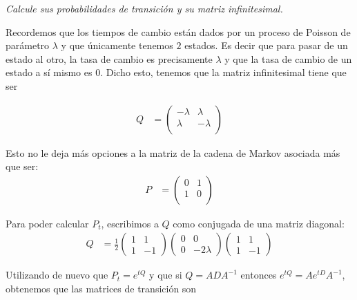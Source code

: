 \emph{
    Calcule sus probabilidades de transici\'on y su matriz infinitesimal.\pn
}

\afterstatement\pn

Recordemos que los tiempos de cambio están dados por un proceso de Poisson
de parámetro $\lambda$ y que únicamente tenemos $2$ estados. Es decir que
para pasar de un estado al otro, la tasa de cambio es precisamente $\lambda$ y
que la tasa de cambio de un estado a sí mismo es $0$. Dicho esto, 
tenemos que la matriz infinitesimal tiene que ser

\begin{align}
        Q   &= 
            \begin{pmatrix}
                    -\lambda    &   \lambda     \\
                    \lambda     &   -\lambda    \\
            \end{pmatrix}
\end{align}\pn

Esto no le deja más opciones a la matriz de la cadena de Markov asociada más que ser:
\begin{align}
        P   &=
            \begin{pmatrix}
                0   &   1\\
                1   &   0\\
            \end{pmatrix}
\end{align}\pn

Para poder calcular $P_t$, escribimos a $Q$ como conjugada de una matriz diagonal:
\begin{align}
       Q    &=
            \frac{1}{2}
            \begin{pmatrix}
                1 & 1       \\
                1 & -1
            \end{pmatrix}           
            \begin{pmatrix}
                0 & 0       \\
                0 & -2\lambda
            \end{pmatrix}
            \begin{pmatrix}
                1 & 1   \\
                1 & -1
            \end{pmatrix}
\end{align}\pn

Utilizando de nuevo que $P_t = e^{tQ}$ y que si $Q = A D A^{-1}$ entonces $e^{tQ} = Ae^{tD}A^{-1}$, 
obtenemos que las matrices de transición son

